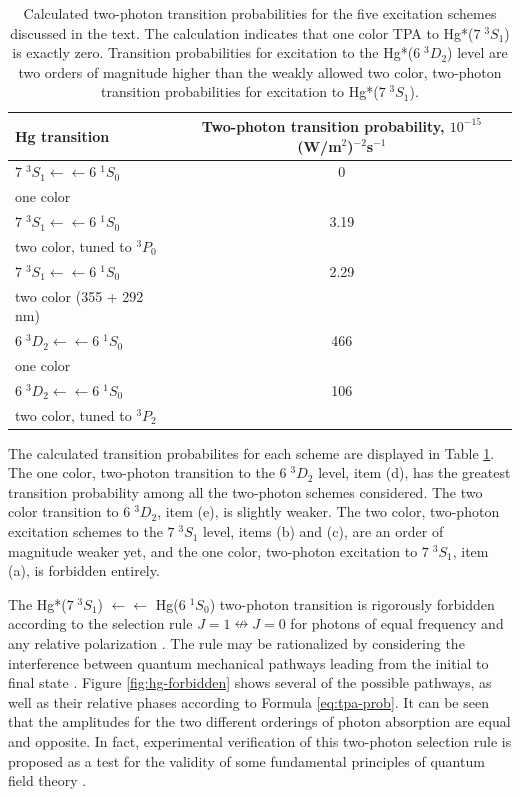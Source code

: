 \begin{table}
  \caption{Calculated two-photon transition probabilities for the five
    excitation schemes discussed in the text.  The
    calculation indicates that one color TPA to Hg*($7 \; ^3S_1$)
    is exactly zero.  Transition probabilities for excitation to the
    Hg*($6 \; ^3D_2$) level are two orders of magnitude higher than the
    weakly allowed two color, two-photon transition probabilities for excitation to
    Hg*($7 \; ^3S_1$).}
  \label{table:tpa-prob}
  \centering
  \vspace{1cm}
  \begin{tabular}{lc}
    \toprule
    Hg transition & Two-photon transition probability, $10^{-15}$ (W/m$^2$)$^{-2}$s$^{-1}$\\
    \midrule
    $7 \; ^3S_1 \leftarrow \leftarrow 6 \; ^1S_0$ & 0 \\
    one color\\
    $7 \; ^3S_1 \leftarrow \leftarrow 6 \; ^1S_0$ & 3.19 \\ 
    two color, tuned to $^3P_0$\\
    $7 \; ^3S_1 \leftarrow \leftarrow 6 \; ^1S_0$ & 2.29 \\
    two color (355 + 292 nm)\\
    $6 \; ^3D_2 \leftarrow \leftarrow 6 \; ^1S_0$ & 466 \\
    one color\\
    $6 \; ^3D_2 \leftarrow \leftarrow 6 \; ^1S_0$ & 106 \\
    two color, tuned to $^3P_2$\\
    \bottomrule
  \end{tabular}
\end{table}

The calculated transition probabilites for each scheme are displayed
in Table \ref{table:tpa-prob}.  The one color, two-photon transition
to the $6 \; ^3D_2$ level, item (d), has the greatest transition
probability among all the two-photon schemes considered.  The two
color transition to $6 \; ^3D_2$, item (e), is slightly weaker.  The
two color, two-photon excitation schemes to the $7 \; ^3S_1$ level,
items (b) and (c), are an order of magnitude weaker yet, and the one
color, two-photon excitation to $7 \; ^3S_1$, item (a), is forbidden
entirely.

The Hg*($7 \; ^3S_1$) $\leftarrow\leftarrow$ Hg($6 \; ^1S_0$)
two-photon transition is rigorously forbidden according to the
selection rule $J=1 \nleftrightarrow J=0$ for photons of equal
frequency and any relative polarization \cite{bonin84}.  The rule may
be rationalized by considering the interference between quantum
mechanical pathways leading from the initial to final state
\cite{bonin84, grynberg77}.  Figure \ref{fig:hg-forbidden} shows
several of the possible pathways, as well as their relative phases
according to Formula \ref{eq:tpa-prob}.  It can be seen that the
amplitudes for the two different orderings of photon absorption are
equal and opposite.  In fact, experimental verification of this
two-photon selection rule is proposed as a test for the validity of
some fundamental principles of quantum field theory \cite{hilborn02}.

